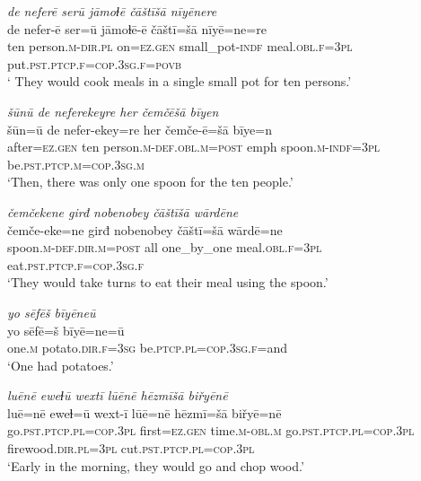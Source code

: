 \ea \label{ŽE.27}
\textit{de neferē serū jāmoɫē čāštīšā nīyēnere} \\ 
\gll de nefer-ē ser=ū jāmoɫē-ē čāštī=šā nīyē=ne=re \\ 
 ten person\textsc{.m}\textsc{-dir}\textsc{.pl} on\textsc{\textsc{=ez.gen}} small\_pot\textsc{-indf} meal\textsc{.obl}\textsc{.f}\textsc{=3pl} put\textsc{.pst}\textsc{.ptcp}\textsc{.f}\textsc{=cop}\textsc{.3sg}\textsc{.f}\textsc{=\textsc{povb}} \\ 
\glt ` They would cook meals in a single small pot for ten persons.'
\z 
 
\ea \label{ŽE.28}
\textit{šūnū de neferekeyre her čemčēšā bīyen} \\ 
\gll šūn=ū de nefer-ekey=re her čemče-ē=šā bīye=n \\ 
 after\textsc{\textsc{=ez.gen}} ten person\textsc{.m}\textsc{-def}\textsc{.obl}\textsc{.m}\textsc{=\textsc{post}} emph spoon\textsc{.m}\textsc{-indf}\textsc{=3pl} be\textsc{.pst}\textsc{.ptcp}\textsc{.m}\textsc{=cop}\textsc{.3sg}\textsc{.m} \\ 
\glt `Then, there was only one spoon for the ten people.'
\z 
 
\ea \label{ŽE.29}
\textit{čemčekene girđ nobenobey čāštīšā wārdēne} \\ 
\gll čemče-eke=ne girđ nobenobey čāštī=šā wārdē=ne \\ 
 spoon\textsc{.m}\textsc{-def}\textsc{.dir}\textsc{.m}\textsc{=\textsc{post}} all one\_by\_one meal\textsc{.obl}\textsc{.f}\textsc{=3pl} eat\textsc{.pst}\textsc{.ptcp}\textsc{.f}\textsc{=cop}\textsc{.3sg}\textsc{.f} \\ 
\glt `They would take turns to eat their meal using the spoon.'
\z 
 
\ea \label{ŽE.32}
\textit{yo sēfēš bīyēneū} \\ 
\gll yo sēfē=š bīyē=ne=ū \\ 
 one\textsc{.m} potato\textsc{.dir}\textsc{.f}\textsc{=3sg} be\textsc{.ptcp}\textsc{.pl}\textsc{=cop}\textsc{.3sg}\textsc{.f}=and \\ 
\glt `One had potatoes.'
\z 
 
\ea \label{ŽE.33}
\textit{luēnē eweɫū wextī lūēnē hēzmīšā biřyēnē} \\ 
\gll luē=nē eweɫ=ū wext-ī lūē=nē hēzmī=šā biřyē=nē \\ 
 go\textsc{.pst}\textsc{.ptcp}\textsc{.pl}\textsc{=cop}\textsc{.3pl} first\textsc{\textsc{=ez.gen}} time\textsc{.m}\textsc{-obl}\textsc{.m} go\textsc{.pst}\textsc{.ptcp}\textsc{.pl}\textsc{=cop}\textsc{.3pl} firewood\textsc{.dir}\textsc{.pl}\textsc{=3pl} cut\textsc{.pst}\textsc{.ptcp}\textsc{.pl}\textsc{=cop}\textsc{.3pl} \\ 
\glt `Early in the morning, they would go and chop wood.'
\z 
 
